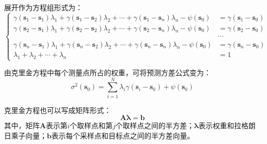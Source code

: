 展开作为方程组形式为：
\begin{equation}
    \left\{
    \begin{aligned}
        \gamma \left( \mathbf{s}_{1} - \mathbf{s}_{1} \right) \lambda_{1}+ \gamma \left( \mathbf{s}_{1} - \mathbf{s}_{2} \right) \lambda_{2}+\cdots + \gamma \left( \mathbf{s}_{1} - \mathbf{s}_{n} \right) \lambda_{n}-\psi\left( \mathbf{s}_{0} \right)    & = \gamma \left( \mathbf{s}_{1} - \mathbf{s}_{0} \right) \\
        \gamma \left( \mathbf{s}_{2} - \mathbf{s}_{1} \right) \lambda_{1} + \gamma \left( \mathbf{s}_{2} - \mathbf{s}_{2} \right) \lambda_{2} + \cdots + \gamma \left( \mathbf{s}_{2} - \mathbf{s}_{n} \right) \lambda_{n}-\psi\left( \mathbf{s}_{0} \right) & = \gamma \left( \mathbf{s}_{2} - \mathbf{s}_{0} \right) \\                                                                & \cdots                                                  \\
        \gamma \left( \mathbf{s}_{n} - \mathbf{s}_{1} \right) \lambda_{1}+\gamma \left( \mathbf{s}_{n} - \mathbf{s}_{2} \right) \lambda_{2}+\cdots+\gamma \left( \mathbf{s}_{n} - \mathbf{s}_{n} \right)\lambda_{n}-\psi\left( \mathbf{s}_{0} \right)        & = \gamma \left( \mathbf{s}_{n} - \mathbf{s}_{0} \right) \\
        \lambda_{1}+\lambda_{2}+\cdots+\lambda_{n}                                                                                                                                                                                                           & =1
    \end{aligned}
    \right.
    \label{克里金方程线性方程组}
\end{equation}

由克里金方程中每个测量点所占的权重，可将预测方差公式变为：
\begin{equation}
    \sigma^{2}\left( \mathbf{s}_{0} \right) = \sum_{i=1}^{N} \lambda_{i} \gamma \left( \mathbf{s}_{i} - \mathbf{s}_{0} \right) + \psi \left( \mathbf{s}_{0} \right)
    \label{点克里金法预测方差公式}
\end{equation}

克里金方程也可以写成矩阵形式：
\begin{equation}
    \mathbf{A} \mathbf{\lambda} = \mathbf{b}
    \label{点克里金方程矩阵形式}
\end{equation}
其中，矩阵$ \mathbf{A} $表示第$ i $个取样点和第$ j $个取样点之间的半方差；$ \mathbf{\lambda} $表示权重和拉格朗日乘子向量；$ \mathbf{b} $表示每个采样点和目标点之间的半方差向量。

